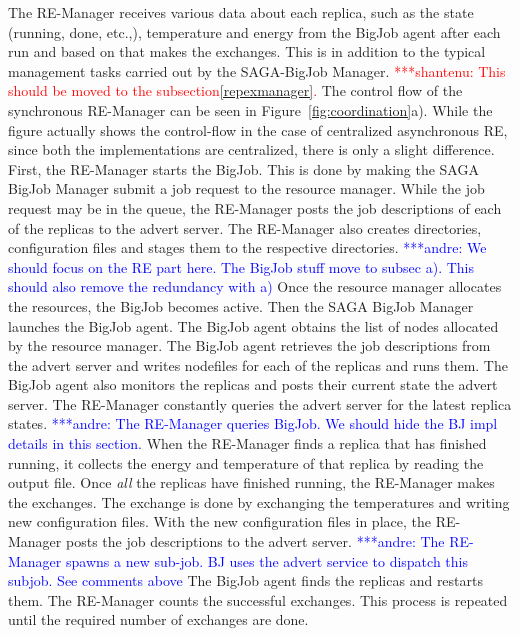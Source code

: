 \documentclass{rspublic}
\newcommand{\jhanote}[1]{ {\textcolor{red} { ***shantenu: #1 }}}
\newcommand{\alnote}[1]{ {\textcolor{blue} { ***andre: #1 }}}
\newcommand{\alnote}[1]{}
\newcommand{\jhanote}[1]{}
\begin{document}
The RE-Manager receives various data about each
replica, such as the state (running, done, etc.,), temperature and
energy from the BigJob agent after each run and based on that makes
the exchanges. This is in addition to the typical management tasks
carried out by the SAGA-BigJob Manager.  \jhanote{This should be 
moved to the subsection\ref{repexmanager}.}
The control flow of the synchronous RE-Manager can be seen in 
Figure~\ref{fig:coordination}a). While the figure actually shows 
the control-flow in the case of centralized asynchronous RE, since 
both the implementations are centralized, there is only a slight 
difference. First, the RE-Manager starts the BigJob. This is done 
by making the SAGA BigJob Manager submit a job request to the 
resource manager. While the job request may be in the queue, the 
RE-Manager posts the job descriptions of each of the replicas 
to the advert server. The RE-Manager also creates directories, 
configuration files and stages them to the respective directories. 
\alnote{We should focus on the RE part here. The BigJob stuff move to subsec a). This
should also remove the redundancy with a)}
Once the resource manager allocates the resources, the BigJob becomes 
active. Then the SAGA BigJob Manager launches the BigJob agent. 
The BigJob agent obtains the list of nodes allocated by the resource manager. 
The BigJob agent retrieves the job descriptions from the advert server and 
writes nodefiles for each of the replicas and runs them. The BigJob agent 
also monitors the replicas and posts their current state the advert server. 
The RE-Manager constantly queries the advert server for the latest replica 
states. \alnote{The RE-Manager queries BigJob. We should hide the BJ impl details in this section.} 
When the RE-Manager finds a replica that has finished running, it collects the energy and temperature of that replica by reading the output file. Once \emph{all} the replicas have finished running, the RE-Manager makes the exchanges. The exchange is done by exchanging the temperatures and writing new configuration files. With the new configuration files in place, the RE-Manager posts the job descriptions to the advert server. \alnote{The RE-Manager spawns a new sub-job. BJ uses the advert service to dispatch this subjob. See comments above}
The BigJob agent finds the replicas and restarts them. The RE-Manager counts the successful exchanges. This process is repeated until the required number of exchanges are done. 
\end{document}
